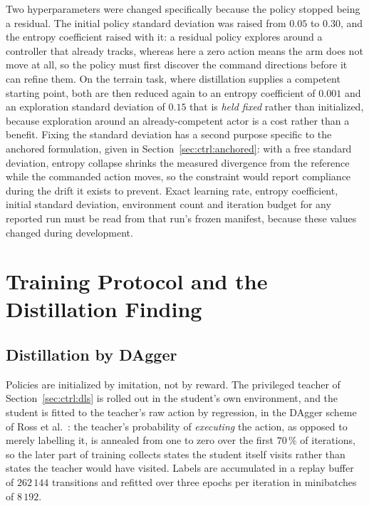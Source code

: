 Two hyperparameters were changed specifically because the policy stopped
being a residual. The initial policy standard
deviation was raised from $0.05$ to $0.30$, and the entropy coefficient
raised with it: a residual policy explores around a controller that already
tracks, whereas here a zero action means the arm does not move at all, so the
policy must first discover the command directions before it can refine them.
On the terrain task, where distillation supplies a competent starting point,
both are then reduced again to an entropy coefficient of $0.001$ and an
exploration standard deviation of $0.15$ that is \emph{held fixed} rather
than initialized, because exploration around an already-competent actor is a cost rather than
a benefit. Fixing the standard deviation has a second purpose specific to the
anchored formulation, given in Section~\ref{sec:ctrl:anchored}: with a free
standard deviation, entropy collapse shrinks the measured divergence from the
reference while the commanded action moves, so the constraint would report compliance during the drift it exists to prevent. Exact learning rate, entropy coefficient,
initial standard deviation, environment count and iteration budget for any
reported run must be read from that run's frozen manifest, because these
values changed during development.

\section{Training Protocol and the Distillation Finding}
\label{sec:ctrl:training}

\subsection{Distillation by DAgger}

Policies are initialized by imitation, not by reward. The privileged teacher of
Section~\ref{sec:ctrl:dls} is rolled out in the student's own environment, and
the student is fitted to the teacher's raw action by regression, in the DAgger
scheme of Ross et al.~\cite{ross2011reduction}: the teacher's probability of
\emph{executing} the action, as opposed to merely labelling it, is annealed
from one to zero over the first $70\,\%$ of iterations, so the later part of
training collects states the student itself visits rather than states the
teacher would have visited. Labels are accumulated in a replay buffer of
$262\,144$ transitions and refitted over three epochs per iteration in
minibatches of $8\,192$.

